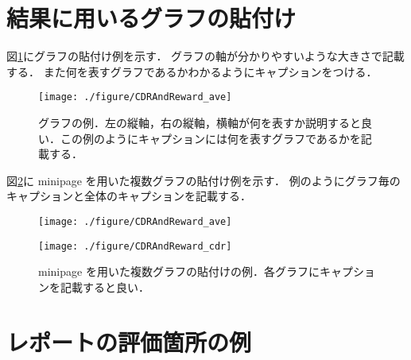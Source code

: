 \documentclass[10pt,a4paper,dvipdfmx]{jsarticle}%
\begin{document}
\section{結果に用いるグラフの貼付け}

図\ref{fig:example1}にグラフの貼付け例を示す．
グラフの軸が分かりやすいような大きさで記載する．
また何を表すグラフであるかわかるようにキャプションをつける．

\begin{figure}[htbp]
	\centering
	\texttt{[image: ./figure/CDRAndReward\_ave]}
	\caption{\label{fig:example1}グラフの例．左の縦軸，右の縦軸，横軸が何を表すか説明すると良い．この例のようにキャプションには何を表すグラフであるかを記載する．}
\end{figure}

図\ref{fig:example2}に minipage を用いた複数グラフの貼付け例を示す．
例のようにグラフ毎のキャプションと全体のキャプションを記載する．

\begin{figure}[htbp]
	\centering
	\begin{minipage}[b]{0.49\textwidth}
		\centering
		\texttt{[image: ./figure/CDRAndReward\_ave]}
	\end{minipage}
	\begin{minipage}[b]{0.49\textwidth}
		\centering
		\texttt{[image: ./figure/CDRAndReward\_cdr]}
	\end{minipage}
	\caption{\label{fig:example2} minipage を用いた複数グラフの貼付けの例．各グラフにキャプションを記載すると良い．}
\end{figure}

\section{レポートの評価箇所の例}
\end{document}
